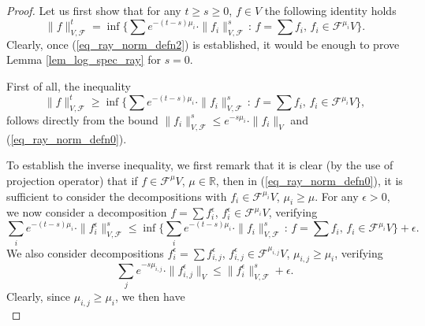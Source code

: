 \documentclass[10pt,a4paper]{amsart}
\newcommand{\real}{\mathbb{R}}
\begin{document}
	\begin{proof}
		Let us first show that for any $t \geq s \geq 0$, $f \in V$ the following identity holds
		\begin{equation}\label{eq_ray_norm_defn2}
			\| f \|_{V, \mathcal{F}}^t =
			\inf 
			\Big\{
				\sum
				e^{- (t - s) \mu_i} \cdot 
				\| f_i \|_{V, \mathcal{F}}^s
				\,
				:
				\,
				f = \sum f_i, \, f_i \in \mathcal{F}^{\mu_i} V
			\Big\}.
		\end{equation}
		Clearly, once (\ref{eq_ray_norm_defn2}) is established, it would be enough to prove Lemma \ref{lem_log_spec_ray} for $s = 0$.
		\par 
		First of all, the inequality 
		\begin{equation}\label{eq_ray_norm_defn2aa1}
			\| f \|_{V, \mathcal{F}}^t \geq
			\inf 
			\Big\{
				\sum
				e^{- (t - s) \mu_i} \cdot 
				\| f_i \|_{V, \mathcal{F}}^s
				\,
				:
				\,
				f = \sum f_i, \, f_i \in \mathcal{F}^{\mu_i} V
			\Big\},
		\end{equation}
		follows directly from the bound $\| f_i \|_{V, \mathcal{F}}^s \leq e^{- s \mu_i} \cdot \| f_i \|_V$ and (\ref{eq_ray_norm_defn0}).
		\par 
		To establish the inverse inequality, we first remark that it is clear (by the use of projection operator) that if $f  \in \mathcal{F}^{\mu} V$, $\mu \in \real$, then in (\ref{eq_ray_norm_defn0}), it is sufficient to consider the decompositions with $f_i \in \mathcal{F}^{\mu_i} V$, $\mu_i \geq \mu$.
		For any $\epsilon > 0$, we now consider a decomposition $f = \sum f_i^{\epsilon}$, $f_i^{\epsilon} \in \mathcal{F}^{\mu_i} V$, verifying
		\begin{equation}
			\sum_{i}
				e^{- (t - s) \mu_i} \cdot 
				\| f_i^{\epsilon} \|_{V, \mathcal{F}}^s
			\leq
			\inf 
			\Big\{
				\sum_{i}
				e^{- (t - s) \mu_i} \cdot 
				\| f_i \|_{V, \mathcal{F}}^s
				\,
				:
				\,
				f = \sum f_i, \, f_i \in \mathcal{F}^{\mu_i} V
			\Big\}
			+
			\epsilon.
		\end{equation}
		We also consider decompositions $f_i^{\epsilon} = \sum f_{i, j}^{\epsilon}$, $f_{i, j}^{\epsilon} \in \mathcal{F}^{\mu_{i, j}} V$, $\mu_{i, j} \geq \mu_i$, verifying 
		\begin{equation}
			\sum_{j}
				e^{- s \mu_{i, j}} \cdot 
				\| f_{i, j}^{\epsilon} \|_V
			\leq
			\| f_i^{\epsilon} \|_{V, \mathcal{F}}^s
			+
			\epsilon.
		\end{equation}
		Clearly, since $\mu_{i, j} \geq \mu_i$, we then have
		\begin{equation}

\end{equation}
\end{proof}
\end{document}
